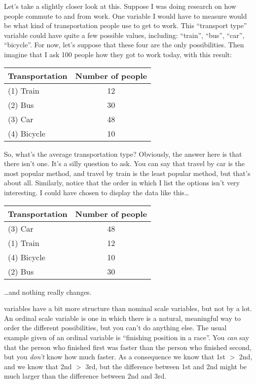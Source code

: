 Let's take a slightly closer look at this. Suppose I was doing research on how people commute to and from work. One variable I would have to measure would be what kind of transportation people use to get to work. This ``transport type'' variable could have quite a few possible values, including: ``train'', ``bus'', ``car'', ``bicycle''. For now, let's suppose that these four are the only possibilities. Then imagine  that I ask 100 people how they got to work today, with this result:
 
 \vspace*{6pt}
 \begin{tabular}{lc}
Transportation & Number of people \\ \hline
 (1) Train & 12 \\
 (2) Bus & 30 \\
 (3) Car & 48 \\
 (4) Bicycle & 10 \\
 \hline
 \end{tabular}
 \vspace*{6pt}
 

So, what's the average transportation type? Obviously, the answer here is that there isn't one. It's a silly question to ask. You can say that travel by car is the most popular method, and travel by train is the least popular method, but that's about all. Similarly, notice that the order in which I list the options isn't very interesting. I could have chosen to display the data like this\ldots
 
  \vspace*{6pt}
  \begin{tabular}{lc}
 Transportation & Number of people \\ \hline
(3) Car & 48 \\
(1) Train & 12 \\
(4) Bicycle & 10 \\
(2) Bus & 30 \\ \hline
 \end{tabular}
 \vspace*{6pt}
 
\noindent
\ldots and nothing really changes.


 variables have a bit more structure than nominal scale variables, but not by a lot. An ordinal scale variable is one in which there is a natural, meaningful way to order the different possibilities, but you can't do anything else. The usual example given of an ordinal variable is ``finishing position in a race''. You {\it can} say that the person who finished first was faster than the person who finished second, but you {\it don't} know how much faster. As a consequence we know that 1st $>$ 2nd, and we know that 2nd $>$ 3rd, but the difference between 1st and 2nd might be much larger than the difference between 2nd and 3rd.

